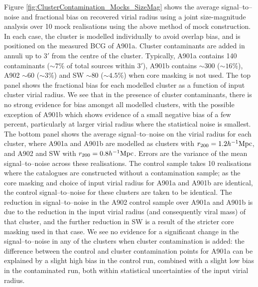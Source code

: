 \documentclass[useAMS,usenatbib,times,letter,amssymb]{mn2e}
\begin{document}
Figure \ref{fig:ClusterContamination_Mocks_SizeMag} shows the average signal--to--noise and fractional bias on recovered virial radius using a joint size-magnitude analysis over 10 mock realisations using the above method of mock construction. In each case, the cluster is modelled individually to avoid overlap bias, and is positioned on the measured BCG of A901a. Cluster contaminants are added in annuli up to $3'$ from the centre of the cluster. Typically, A901a contains 140 contaminants ($\sim 7\%$ of total sources within $3'$), A901b contains $\sim 300$ ($\sim 16\%$), A902  $\sim 60$ ($\sim 3\%$) and SW $\sim 80$ ($\sim 4.5\%$) when core masking is not used.  The top panel shows the fractional bias for each modelled cluster as a function of input cluster virial radius. We see that in the presence of cluster contaminants, there is no strong evidence for bias amongst all modelled clusters, with the possible exception of A901b which shows evidence of a small negative bias of a few percent, particularly at larger virial radius where the statistical noise is smallest. The bottom panel shows the average signal--to--noise on the virial radius for each cluster, where A901a and A901b are modelled as clusters with $r_{200} = 1.2 h^{-1}{\rm Mpc}$, and A902 and SW with $r_{200} = 0.8 h^{-1}{\rm Mpc}$. Errors are the variance of the mean signal--to--noise across these realisations. The control sample takes 10 realisations where the catalogues are constructed without a contamination sample; as the core masking and choice of input virial radius for A901a and A901b are identical, the control signal--to--noise for these clusters are taken to be identical. The reduction in signal--to--noise in the A902 control sample over A901a and A901b is due to the reduction in the input virial radius (and consequently viral mass) of that cluster, and the further reduction in SW is a result of the stricter core masking used in that case. We see no evidence for a significant change in the signal--to--noise in any of the clusters when cluster contamination is added: the difference between the control and cluster contamination points for A901a can be explained by a slight high bias in the control run, combined with a slight low bias in the contaminated run, both within statistical uncertainties of the input virial radius. 
\end{document}
